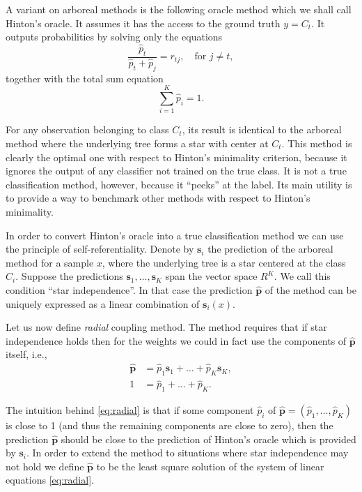\documentclass[pdflatex, sn-basic]{sn-jnl}%
\theoremstyle{thmstyleone}%
\theoremstyle{thmstyletwo}%
\theoremstyle{thmstylethree}%
\begin{document}
A variant on arboreal methods is the following oracle method which we shall call Hinton's oracle. It  assumes it has the access to the ground truth $y = C_t$. It outputs probabilities by solving only the equations
$$
\frac{\hat p_t}{\hat p_t + \hat p_j} = {r}_{tj},\quad \textrm{for }j\not = t,
$$
together   with the total sum equation
$$
\sum_{i=1}^K  \hat p_i = 1.
$$

For any observation belonging to class $C_t$, its result is identical to the arboreal method where the underlying tree forms a star with center at $C_t$. This method is clearly the optimal one with respect to Hinton's minimality criterion, because it ignores the output of any classifier not trained on the true class. It is not a true classification method, however, because it ``peeks'' at the label. Its main utility is to provide a way to benchmark other methods with respect to Hinton's minimality.

In order to convert Hinton's oracle into a true classification method we can use the principle of self-referentiality.  
Denote by $\boldsymbol{s}_i$ the prediction of the arboreal method for a sample $x$, where the underlying tree is a star centered at the class $C_i$. 
Suppose the predictions $\boldsymbol{s}_1, \ldots, \boldsymbol{s}_K$ span the vector space $R^K$. We call this condition ``star independence''.  In that case the prediction $\hat{\boldsymbol{p}}$ of the method  can be uniquely expressed as a linear combination of $\boldsymbol{s}_i(x)$. 

Let us now define \emph{radial} coupling method. The  method requires that if star independence holds then for the  weights we could in fact use the components of $\hat{\boldsymbol{p}}$ itself, i.e.,
\begin{equation}
	\begin{split}
	\hat {\boldsymbol{p}} &= \hat p_1 \boldsymbol{s}_1 + \ldots + \hat p_K \boldsymbol{s}_K,\\
	1 &= \hat p_1 + \ldots + \hat p_K.
	\end{split}
	 \label{eq:radial}
\end{equation}

The intuition behind \eqref{eq:radial} is that if some component $\hat p_i$ of $\hat{\boldsymbol{p}} =(\hat p_1, \ldots, \hat p_K) $ is close to 1 (and thus the remaining components are close to zero), then the prediction $\hat{\boldsymbol{p}}$ should be close to the prediction of Hinton's oracle which is provided by ${\boldsymbol{s}}_i$. 
In order to extend the method to situations where star independence may not hold we define $\hat{\boldsymbol{p}}$ 
to be the least square solution of the  system of linear equations \ref{eq:radial}.
\end{document}
